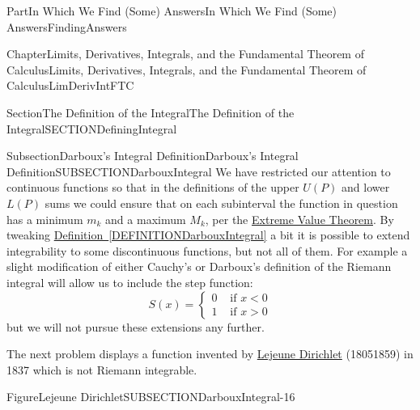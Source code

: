 \documentclass[oneside,10pt,]{book}
\newcommand{\xreffont}{\relax}
\numberwithin{equation}{part}
\newcommand{\lt}{<}
\newcommand{\gt}{>}
\newcommand{\amp}{&}
\begin{document}
\begin{partptx}{Part}{In Which We Find (Some) Answers}{}{In Which We Find (Some) Answers}{}{}{FindingAnswers}
\begin{chapterptx}{Chapter}{Limits, Derivatives, Integrals, and the Fundamental Theorem of Calculus}{}{Limits, Derivatives, Integrals, and the Fundamental Theorem of Calculus}{}{}{LimDerivIntFTC}
\begin{sectionptx}{Section}{The Definition of the Integral}{}{The Definition of the Integral}{}{}{SECTIONDefiningIntegral}
\begin{subsectionptx}{Subsection}{Darboux's Integral Definition}{}{Darboux's Integral Definition}{}{}{SUBSECTIONDarbouxIntegral}
We have restricted our attention to continuous functions so that in the definitions of the upper \(U(P)\) and lower \(L(P)\) sums we could ensure that on each subinterval the function in question has a minimum \(m_k\) and a maximum \(M_k\), per the \hyperref[thm_EVT]{Extreme Value Theorem}.  By tweaking \hyperref[DEFINITIONDarbouxIntegral]{Definition~{\xreffont\ref{DEFINITIONDarbouxIntegral}}} a bit it is possible to extend integrability to some discontinuous functions, but not all of them. For example a slight modification of either Cauchy's or Darboux's definition of the Riemann integral will allow us to include the step function:%
\begin{equation*}
S(x)=
\begin{cases}
0\amp \text{ if } x\lt0\\
1\amp \text{ if } x\gt0
\end{cases}
\end{equation*}
but we will not pursue these extensions any further.%
\par
The next problem displays a function invented by \href{https://mathshistory.st-andrews.ac.uk/Biographies/Dirichlet/}{Lejeune Dirichlet} (1805\textendash{}1859) in 1837 which is not Riemann integrable.    %
\begin{figureptx}{Figure}{Lejeune Dirichlet}{SUBSECTIONDarbouxIntegral-16}{}%
%
%
\begin{image}{0.325}{0.35}{0.325}{}%

\end{image}
\end{figureptx}
\end{subsectionptx}
\end{sectionptx}
\end{chapterptx}
\end{partptx}
\end{document}
